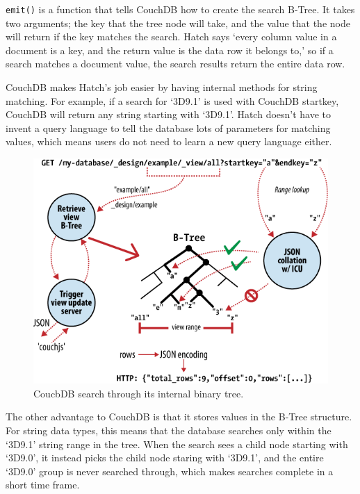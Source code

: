 \texttt{emit()} is a function that tells CouchDB how to create the search B-Tree. It 
takes two arguments; the key that the tree node will take, and the value that the 
node will return if the key matches the search. Hatch says `every column value in a 
document is a key, and the return value is the data row it belongs to,' so if a search
matches a document value, the search results return the entire data row.

CouchDB makes Hatch's job easier by having internal methods for string matching. For
example, if a search for `3D9.1' is used with CouchDB startkey, CouchDB will return
any string starting with `3D9.1'. Hatch doesn't have to invent a query language to 
tell the database lots of parameters for matching values, which means users do not
need to learn a new query language either.

\begin{figure}[h]
	\begin{center}
	\includegraphics[width=120mm]{images/couchdb_b_tree}
	\caption{CoucbDB search through its internal binary tree.} 
	\label{couchdb_b_tree}
	\end{center}
\end{figure}

The other advantage to CouchDB is that it stores values in the B-Tree structure. For
string data types, this means that the database searches only within the `3D9.1' string range
in the tree. When the search sees a child node starting with `3D9.0', it instead picks
the child node staring with `3D9.1', and the entire `3D9.0' group is never searched 
through, which makes searches complete in a short time frame. 
